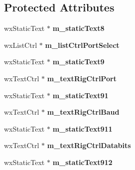 \subsection*{Protected Attributes}
\begin{DoxyCompactItemize}
\item 
\hypertarget{class_dlg_com_ports_af0cbd9e67bbede8e5b1d4ef2941d4ad6}{wx\-Static\-Text $\ast$ {\bfseries m\-\_\-static\-Text8}}\label{class_dlg_com_ports_af0cbd9e67bbede8e5b1d4ef2941d4ad6}

\item 
\hypertarget{class_dlg_com_ports_a79fa4831dbf5e4aa13f239c23d1ca9a8}{wx\-List\-Ctrl $\ast$ {\bfseries m\-\_\-list\-Ctrl\-Port\-Select}}\label{class_dlg_com_ports_a79fa4831dbf5e4aa13f239c23d1ca9a8}

\item 
\hypertarget{class_dlg_com_ports_ae20ae58413be1c7932f9d83f37ccfe3e}{wx\-Static\-Text $\ast$ {\bfseries m\-\_\-static\-Text9}}\label{class_dlg_com_ports_ae20ae58413be1c7932f9d83f37ccfe3e}

\item 
\hypertarget{class_dlg_com_ports_ac9be845d35a7303c5ac404e892f10ffb}{wx\-Text\-Ctrl $\ast$ {\bfseries m\-\_\-text\-Rig\-Ctrl\-Port}}\label{class_dlg_com_ports_ac9be845d35a7303c5ac404e892f10ffb}

\item 
\hypertarget{class_dlg_com_ports_a4767f6424f77abf870d2c90dc7a47a9b}{wx\-Static\-Text $\ast$ {\bfseries m\-\_\-static\-Text91}}\label{class_dlg_com_ports_a4767f6424f77abf870d2c90dc7a47a9b}

\item 
\hypertarget{class_dlg_com_ports_a3ce4c208d87405f7c4242819339039d8}{wx\-Text\-Ctrl $\ast$ {\bfseries m\-\_\-text\-Rig\-Ctrl\-Baud}}\label{class_dlg_com_ports_a3ce4c208d87405f7c4242819339039d8}

\item 
\hypertarget{class_dlg_com_ports_a7a45e6c9f89fa6595fe30611d3240760}{wx\-Static\-Text $\ast$ {\bfseries m\-\_\-static\-Text911}}\label{class_dlg_com_ports_a7a45e6c9f89fa6595fe30611d3240760}

\item 
\hypertarget{class_dlg_com_ports_a480454f649f9bc72afbf42c5e9521e3b}{wx\-Text\-Ctrl $\ast$ {\bfseries m\-\_\-text\-Rig\-Ctrl\-Databits}}\label{class_dlg_com_ports_a480454f649f9bc72afbf42c5e9521e3b}

\item 
\hypertarget{class_dlg_com_ports_a49c213a919a1aff50754fad11b67a44d}{wx\-Static\-Text $\ast$ {\bfseries m\-\_\-static\-Text912}}\label{class_dlg_com_ports_a49c213a919a1aff50754fad11b67a44d}


\end{DoxyCompactItemize}

